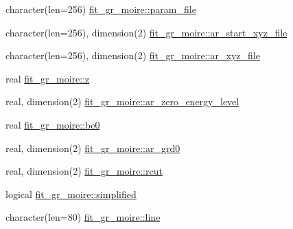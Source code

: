 \begin{DoxyCompactItemize}
\item 
character(len=256) \mbox{\hyperlink{namespacefit__gr__moire_a61b86e6a8a674b819bc9c8b166436c18}{fit\+\_\+gr\+\_\+moire\+::param\+\_\+file}}
\item 
character(len=256), dimension(2) \mbox{\hyperlink{namespacefit__gr__moire_aa54f0200433f85f1399791f7128e94c5}{fit\+\_\+gr\+\_\+moire\+::ar\+\_\+start\+\_\+xyz\+\_\+file}}
\item 
character(len=256), dimension(2) \mbox{\hyperlink{namespacefit__gr__moire_adcea9b8af6d606b09d4cf11353d6e76a}{fit\+\_\+gr\+\_\+moire\+::ar\+\_\+xyz\+\_\+file}}
\item 
real \mbox{\hyperlink{namespacefit__gr__moire_ad1616f835d2564c00ebea11a9c88cbaf}{fit\+\_\+gr\+\_\+moire\+::z}}
\item 
real, dimension(2) \mbox{\hyperlink{namespacefit__gr__moire_a7b9059147432f1a2fab23cc7a14bda96}{fit\+\_\+gr\+\_\+moire\+::ar\+\_\+zero\+\_\+energy\+\_\+level}}
\item 
real \mbox{\hyperlink{namespacefit__gr__moire_a9f35bc32182cc551fabbd2a3a172d812}{fit\+\_\+gr\+\_\+moire\+::be0}}
\item 
real, dimension(2) \mbox{\hyperlink{namespacefit__gr__moire_a133d6649efb184d364f20a02e2afd05f}{fit\+\_\+gr\+\_\+moire\+::ar\+\_\+grd0}}
\item 
real, dimension(2) \mbox{\hyperlink{namespacefit__gr__moire_aa4a0f3a112959e7b4ce4105b57b1ac8b}{fit\+\_\+gr\+\_\+moire\+::rcut}}
\item 
logical \mbox{\hyperlink{namespacefit__gr__moire_a9092ed380be5233a800406322be81218}{fit\+\_\+gr\+\_\+moire\+::simplified}}
\item 
character(len=80) \mbox{\hyperlink{namespacefit__gr__moire_a8fbbcfd1d9c1149a9182a782550ea455}{fit\+\_\+gr\+\_\+moire\+::line}}
\end{DoxyCompactItemize}
